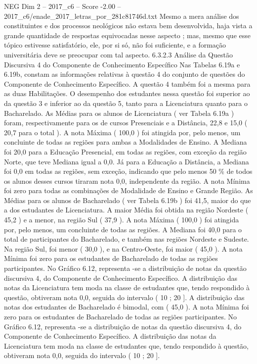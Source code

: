 \begin{textsample}{NEG Dim 2 – 2017\_c6 – Score -2.00 – 2017\_c6/enade\_2017\_letras\_por\_281c81746d.txt}
Mesmo a mera análise dos constituintes e dos processos neológicos não estava bem desenvolvida, haja vista a grande quantidade de respostas equivocadas nesse aspecto ; mas, mesmo que esse tópico estivesse satisfatório, ele, por si só, não foi suficiente, e a formação universitária deve se preocupar com tal aspecto. 6.3.2.3 Análise da Questão Discursiva 4 do Componente de Conhecimento Específico Nas Tabelas 6.19a e 6.19b, constam as informações relativas à questão 4 do conjunto de questões do Componente de Conhecimento Específico.
A questão 4 também foi a mesma para as duas Habilitações.
O desempenho dos estudantes nessa questão foi superior ao da questão 3 e inferior ao da questão 5, tanto para a Licenciatura quanto para o Bacharelado.
As Médias para os alunos de Licenciatura ( ver Tabela 6.19a ) foram, respectivamente para os de cursos Presenciais e a Distância, 22,8 e 15,0 ( 20,7 para o total ).
A nota Máxima ( 100,0 ) foi atingida por, pelo menos, um concluinte de todas as regiões para ambas a Modalidades de Ensino.
A Mediana foi 20,0 para a Educação Presencial, em todas as regiões, com exceção da região Norte, que teve Mediana igual a 0,0.
Já para a Educação a Distância, a Mediana foi 0,0 em todas as regiões, sem exceção, indicando que pelo menos 50 \% de todos os alunos desses cursos tiraram nota 0,0, independente da região.
A nota Mínima foi zero para todas as combinações de Modalidade de Ensino e Grande Região.
As Médias para os alunos de Bacharelado ( ver Tabela 6.19b ) foi 41,5, maior do que a dos estudantes de Licenciatura.
A maior Média foi obtida na região Nordeste ( 45,2 ) e a menor, na região Sul ( 37,9 ).
A nota Máxima ( 100,0 ) foi atingida por, pelo menos, um concluinte de todas as regiões.
A Mediana foi 40,0 para o total de participantes do Bacharelado, e também nas regiões Nordeste e Sudeste.
Na região Sul, foi menor ( 30,0 ), e na Centro-Oeste, foi maior ( 45,0 ).
A nota Mínima foi zero para os estudantes de Bacharelado de todas as regiões participantes.
No Gráfico 6.12, representa -se a distribuição de notas da questão discursiva 4, do Componente de Conhecimento Específico.
A distribuição das notas da Licenciatura tem moda na classe de estudantes que, tendo respondido à questão, obtiveram nota 0,0, seguida do intervalo ( 10 ; 20 ].
A distribuição das notas dos estudantes de Bacharelado é bimodal, com ( 45,0 ).
A nota Mínima foi zero para os estudantes de Bacharelado de todas as regiões participantes.
No Gráfico 6.12, representa -se a distribuição de notas da questão discursiva 4, do Componente de Conhecimento Específico.
A distribuição das notas da Licenciatura tem moda na classe de estudantes que, tendo respondido à questão, obtiveram nota 0,0, seguida do intervalo ( 10 ; 20 ].

\end{textsample}
